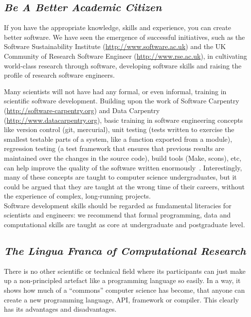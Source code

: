 \documentclass[a4paper,11pt]{article}
\begin{document}
\subsection{{\emph{Be A Better Academic Citizen}}}

If you have the appropriate knowledge, skills and experience, you can
create better software. We have seen the emergence of successful
initiatives, such as the Software Sustainability Institute
(\url{http://www.software.ac.uk}) and the UK Community of Research
Software Engineer (\url{http://www.rse.ac.uk}), in cultivating
world-class research through software, developing software skills and
raising the profile of research software engineers.

Many scientists will not have had any formal, or even informal,
training in scientific software development. Building upon the work of
Software Carpentry (\url{http://software-carpentry.org}) and Data
Carpentry (\url{http://www.datacarpentry.org}), basic training in
software engineering concepts like version control (git, mercurial),
unit testing (tests written to exercise the smallest testable parts of
a system, like a function exported from a module), regression testing
(a test framework that ensures that previous results are maintained
over the changes in the source code), build tools (Make, scons), etc,
can help improve the quality of the software written
enormously~\cite{wilson2006}.  Interestingly, many of these concepts
are taught to computer science undergraduates, but it could be argued
that they are taught at the wrong time of their careers, without the
experience of complex, long-running projects.\\

 Software
development skills should be regarded as fundamental literacies for
scientists and engineers: we recommend that formal programming, data
and computational skills are taught as core at undergraduate and
postgraduate level.

\subsection{{\emph{The Lingua Franca of Computational Research}}}

There is no other scientific or technical field where its participants
can just make up a non-principled artefact like a programming language
so easily. In a way, it shows how much of a ``commons'' computer
science has become, that anyone can create a new programming language,
API, framework or compiler. This clearly has its advantages and
disadvantages.
\end{document}
